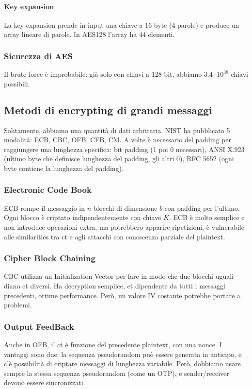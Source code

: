 \documentclass[11pt]{article}
\begin{document}
\paragraph{Key expansion} La key expansion prende in input una chiave a 16 byte (4 parole) e produce un array lineare di parole. In AES128 l'array ha 44 elementi. 

\subsubsection{Sicurezza di AES}
Il brute force è improbabile: già solo con chiavi a 128 bit, abbiamo $3.4\cdot 10^38$ chiavi possibili. 
\subsection{Metodi di encrypting di grandi messaggi}
Solitamente, abbiamo una quantità di dati arbitraria. NIST ha pubblicato 5 modalità: ECB, CBC, OFB, CFB, CM. A volte è necessario del padding per raggiungere una lunghezza specifica: bit padding (1 poi 0 necessari), ANSI X.923 (ultimo byte che definisce lunghezza del padding, gli altri 0), RFC 5652 (ogni byte contiene la lunghezza del padding). 
\subsubsection{Electronic Code Book}
ECB rompe il messaggio in $n$ blocchi di dimensione $b$ con padding per l'ultimo. Ogni blocco è criptato indipendentemente con chiave $K$. ECB è molto semplice e non introduce operazioni extra, ma potrebbero apparire ripetizioni, è vulnerabile alle similarities tra ct e agli attacchi con conoscenza parziale del plaintext.
\subsubsection{Cipher Block Chaining}
CBC utilizza un Initialization Vector per fare in modo che due blocchi uguali diano ct diversi. Ha decryption semplice, ct dipendente da tutti i messaggi precedenti, ottime performance. Però, un valore IV costante potrebbe portare a problemi.
\subsubsection{Output FeedBack}
Anche in OFB, il ct è funzione del precedente plaintext, con una nonce. I vantaggi sono due: la sequenza pseudorandom può essere generata in anticipo, e c'è possibilità di criptare messaggi di lunghezza variabile. Però, dobbiamo usare sempre la stessa sequenza pseudorandom (come un OTP), e sender/receiver devono essere sincronizzati. 
\end{document}
